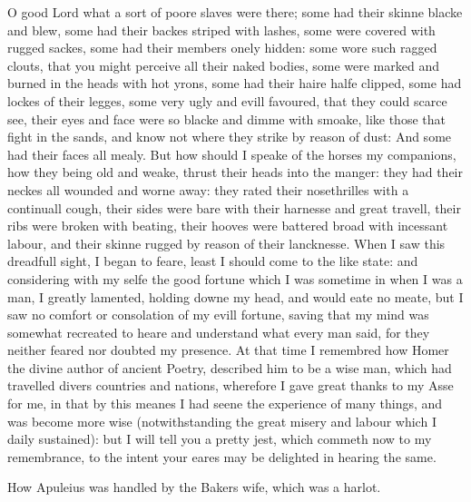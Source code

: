 O good Lord what a sort of poore slaves were there; some had their skinne
blacke and blew, some had their backes striped with lashes, some were covered
with rugged sackes, some had their members onely hidden: some wore such ragged
clouts, that you might perceive all their naked bodies, some were marked and
burned in the heads with hot yrons, some had their haire halfe clipped, some
had lockes of their legges, some very ugly and evill favoured, that they could
scarce see, their eyes and face were so blacke and dimme with smoake, like
those that fight in the sands, and know not where they strike by reason of
dust: And some had their faces all mealy. But how should I speake of the horses
my companions, how they being old and weake, thrust their heads into the
manger: they had their neckes all wounded and worne away: they rated their
nosethrilles with a continuall cough, their sides were bare with their harnesse
and great travell, their ribs were broken with beating, their hooves were
battered broad with incessant labour, and their skinne rugged by reason of
their lancknesse. When I saw this dreadfull sight, I began to feare, least I
should come to the like state: and considering with my selfe the good fortune
which I was sometime in when I was a man, I greatly lamented, holding downe my
head, and would eate no meate, but I saw no comfort or consolation of my evill
fortune, saving that my mind was somewhat recreated to heare and understand
what every man said, for they neither feared nor doubted my presence. At that
time I remembred how Homer the divine author of ancient Poetry, described him
to be a wise man, which had travelled divers countries and nations, wherefore I
gave great thanks to my Asse for me, in that by this meanes I had seene the
experience of many things, and was become more wise (notwithstanding the great
misery and labour which I daily sustained): but I will tell you a pretty jest,
which commeth now to my remembrance, to the intent your eares may be delighted
in hearing the same.


How Apuleius was handled by the Bakers wife, which was a harlot.

